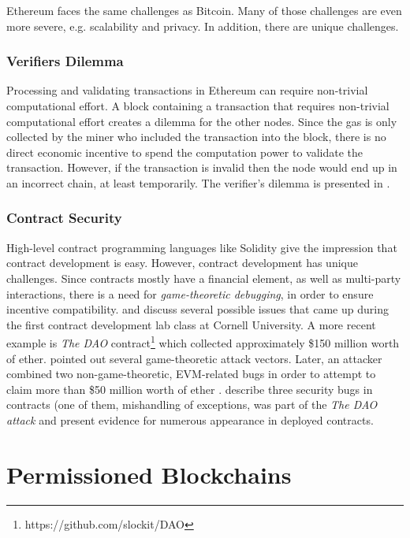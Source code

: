Ethereum faces the same challenges as Bitcoin. Many of those challenges are even more severe, e.g. scalability and privacy. In addition, there are unique challenges.

\subsubsection{Verifiers Dilemma}
Processing and validating transactions in Ethereum can require non-trivial computational effort.
A block containing a transaction that requires non-trivial computational effort creates a dilemma for the other nodes. Since the gas is only collected by the miner who included the transaction into the block, there is no direct economic incentive to spend the computation power to validate the transaction. However, if the transaction is invalid then the node would end up in an incorrect chain, at least temporarily.
The verifier's dilemma is presented in \parencite{Luu:2015:DIC:2810103.2813659}.

\subsubsection{Contract Security}

High-level contract programming languages like Solidity give the impression that contract development is easy. However, contract development has unique challenges. Since contracts mostly have a financial element, as well as multi-party interactions, there is a need for \emph{game-theoretic debugging}, in order to ensure incentive compatibility. \cite{delmolino2015programmer} and \cite{delmolino2015step} discuss several possible issues that came up during the first contract development lab class at Cornell University. A more recent example is \emph{The DAO} contract\footnote{https://github.com/slockit/DAO} which collected approximately \$150 million worth of ether. \cite{mark2016} pointed out several game-theoretic attack vectors. Later, an attacker combined two non-game-theoretic, EVM-related bugs in order to attempt to claim more than \$50 million worth of ether \parencite{daian2016dao}. \cite{cryptoeprint:2016:633} describe three security bugs in contracts (one of them, mishandling of exceptions, was part of the \emph{The DAO attack} and present evidence for numerous appearance in deployed contracts.

\section{Permissioned Blockchains}

